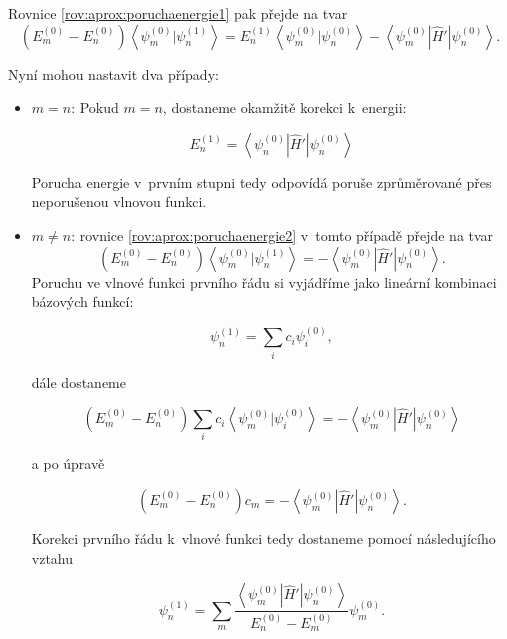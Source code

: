 \noindent Rovnice \ref{rov:aprox:poruchaenergie1} pak přejde na tvar
\begin{equation}
\left(E_m^{(0)}-E_n^{(0)}\right)\left < \psi_m^{(0)}|\psi_n^{(1)} \right >=
E_n^{(1)}\left < \psi_m^{(0)}|\psi_n^{(0)} \right >-
\left < \psi_m^{(0)}|\hat{H}'|\psi_n^{(0)} \right >.
\label{rov:aprox:poruchaenergie2}
\end{equation}

\noindent Nyní mohou nastavit dva případy:
\begin{itemize}
\item $m=n$:
Pokud $m=n$, dostaneme okamžitě korekci k~energii:


\begin{equation}
E_n^{(1)}=\left < \psi_n^{(0)}|\hat{H}'|\psi_n^{(0)} \right >
\label{rov:PorusenaEnergie}
\end{equation} 

Porucha energie v~prvním stupni tedy odpovídá poruše zprůměrované přes neporušenou vlnovou funkci.

\item $m \neq n$:
rovnice \ref{rov:aprox:poruchaenergie2} v~tomto případě přejde na tvar
\begin{equation}
\left(E_m^{(0)}-E_n^{(0)}\right)\left < \psi_m^{(0)}|\psi_n^{(1)} \right >=
-\left < \psi_m^{(0)}|\hat{H}'|\psi_n^{(0)} \right >.
\end{equation}
 Poruchu ve vlnové funkci prvního řádu si vyjádříme jako lineární kombinaci bázových funkcí:

\begin{equation}
\psi_n^{(1)}=\sum_i c_i \psi^{(0)}_i, 
\end{equation}

dále dostaneme

\begin{equation}
\left(E_m^{(0)}-E_n^{(0)}\right)\sum_i c_i\left < \psi_m^{(0)}| \psi^{(0)}_i \right >=
-\left < \psi_m^{(0)}|\hat{H}'|\psi_n^{(0)} \right >
\end{equation}

a po úpravě 

\begin{equation}
\left(E_m^{(0)}-E_n^{(0)}\right) c_m=
-\left < \psi_m^{(0)}|\hat{H}'|\psi_n^{(0)} \right >.
\end{equation}

Korekci prvního řádu k~vlnové funkci tedy dostaneme pomocí následujícího vztahu 

\begin{equation}
\psi_n^{(1)}=\sum_m \frac{\left < \psi_m^{(0)}|\hat{H}'|\psi_n^{(0)} \right >}{E_n^{(0)}-E_m^{(0)}}\psi_m^{(0)}.
\end{equation} 

\end{itemize}

